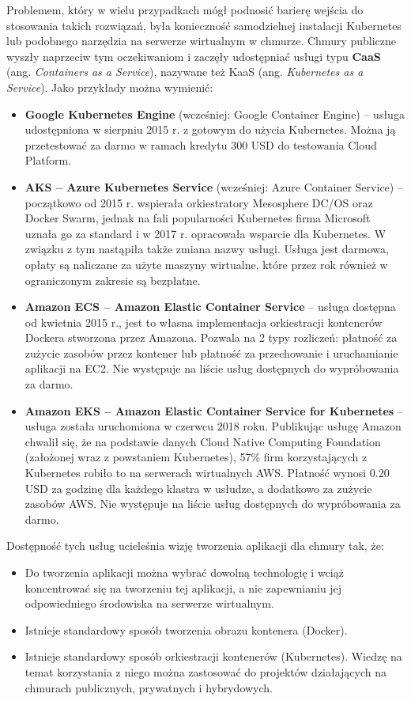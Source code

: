 \documentclass[12pt,a4paper,twoside,titlepage,openright]{book}
\begin{document}
Problemem, który w wielu przypadkach mógł podnosić barierę wejścia do stosowania takich rozwiązań, była konieczność samodzielnej instalacji Kubernetes lub podobnego narzędzia na serwerze wirtualnym w chmurze. Chmury publiczne wyszły naprzeciw tym oczekiwaniom i zaczęły udostępniać usługi typu \textbf{CaaS} (ang. \textit{Containers as a Service}), nazywane też KaaS (ang. \textit{Kubernetes as a Service}). Jako przykłady można wymienić:
\begin{itemize}
\item \textbf{Google Kubernetes Engine} (wcześniej: Google Container Engine) -- usługa udostępniona w sierpniu 2015 r. \cite{siteGoogleBlogKubernetes} z gotowym do użycia Kubernetes. Można ją przetestować za darmo w ramach kredytu 300 USD do testowania Cloud Platform.\cite{siteGoogleTry}
\item \textbf{AKS -- Azure Kubernetes Service} (wcześniej: Azure Container Service) -- początkowo od 2015 r. wspierała orkiestratory Mesosphere DC/OS oraz Docker Swarm, jednak na fali popularności Kubernetes firma Microsoft uznała go za standard i w 2017 r. opracowała wsparcie dla Kubernetes. W związku z tym nastąpiła także zmiana nazwy usługi. \cite{siteMicrosoftBlogAks} Usługa jest darmowa\cite{siteAksPricing}, opłaty są naliczane za użyte maszyny wirtualne, które przez rok również w ograniczonym zakresie są bezpłatne.\cite{siteAzureTry}
\item \textbf{Amazon ECS -- Amazon Elastic Container Service} -- usługa dostępna od kwietnia 2015 r., jest to własna implementacja orkiestracji kontenerów Dockera stworzona przez Amazona. Pozwala na 2 typy rozliczeń: płatność za zużycie zasobów przez kontener lub płatność za przechowanie i uruchamianie aplikacji na EC2.\cite{siteAmazonEcsPricing} Nie występuje na liście usług dostępnych do wypróbowania za darmo.\cite{siteAmazonTry}
\item \textbf{Amazon EKS -- Amazon Elastic Container Service for Kubernetes} -- usługa została uruchomiona w czerwcu 2018 roku. Publikując usługę Amazon chwalił się, że na podstawie danych Cloud Native Computing Foundation (założonej wraz z powstaniem Kubernetes), 57\% firm korzystających z Kubernetes robiło to na serwerach wirtualnych AWS. Płatność wynosi 0.20 USD za godzinę dla każdego klastra w usłudze, a dodatkowo za zużycie zasobów AWS.\cite{siteAmazonEksPricing} Nie występuje na liście usług dostępnych do wypróbowania za darmo.\cite{siteAmazonTry}
\end{itemize}

Dostępność tych usług ucieleśnia wizję tworzenia aplikacji dla chmury tak,	 że:
\begin{itemize}
\item Do tworzenia aplikacji można wybrać dowolną technologię i wciąż koncentrować się na tworzeniu tej aplikacji, a nie zapewnianiu jej odpowiedniego środowiska na serwerze wirtualnym.
\item Istnieje standardowy sposób tworzenia obrazu kontenera (Docker).
\item Istnieje standardowy sposób orkiestracji kontenerów (Kubernetes). Wiedzę na temat korzystania z niego można zastosować do projektów działających na chmurach publicznych, prywatnych i hybrydowych.
\end{itemize}
\end{document}
